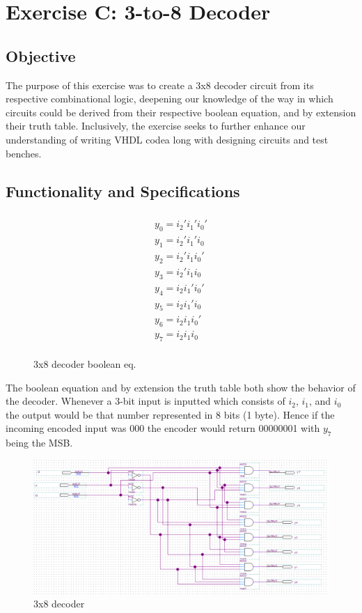 \documentclass[12pt]{article}
\begin{document}
\clearpage
\section{Exercise C: 3-to-8 Decoder}
\subsection{Objective}
The purpose of this exercise was to create a 3x8 decoder circuit from its respective combinational logic, deepening our knowledge of the way in which circuits could be derived from their respective boolean equation, and by extension their truth table. Inclusively, the exercise seeks to further enhance our understanding of writing VHDL codea long with designing circuits and test benches.

\subsection{Functionality and Specifications}

\begin{figure}[h]
    \begin{multline}
        \\y_0 = i_2'i_1'i_0' \\
        y_1 = i_2'i_1'i_0 \\
        y_2 = i_2'i_1i_0' \\
        y_3 = i_2'i_1i_0 \\
        y_4 = i_2i_1'i_0' \\
        y_5 = i_2i_1'i_0 \\
        y_6 = i_2i_1i_0' \\
        y_7 = i_2i_1i_0 \\
    \end{multline}
    \caption{3x8 decoder boolean eq.}
\end{figure}

\noindent The boolean equation and by extension the truth table both show the behavior of the decoder. Whenever a 3-bit input is inputted which consists of $i_2$, $i_1$, and $i_0$ the output would be that number represented in 8 bits (1 byte). Hence if the incoming encoded input was 000 the encoder would return 00000001 with $y_7$ being the MSB. 

\begin{figure}[h]
\caption{3x8 decoder}
\includegraphics[width=\textwidth]{./diagrams/3x8_decoder.png}
\end{figure}
\end{document}
